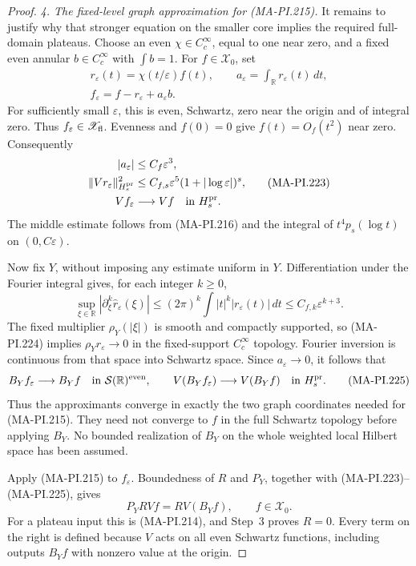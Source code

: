 \begin{proof}
\emph{4. The fixed-level graph approximation for (MA-PI.215).}
It remains to justify why that stronger equation on the
smaller core implies the required full-domain plateaus.
Choose an even \(\chi\in C_c^\infty\), equal to one near
zero, and a fixed even annular \(b\in C_c^\infty\) with
\(\int b=1\).  For \(f\in\mathscr X_0\), set
\[
 \begin{gathered}
 r_\varepsilon(t)=\chi(t/\varepsilon)f(t),\qquad
 a_\varepsilon=\int_{\mathbb R}r_\varepsilon(t)\,dt,\\
 f_\varepsilon=f-r_\varepsilon+a_\varepsilon b.
 \end{gathered}
 \tag{MA-PI.222}
\]
For sufficiently small \(\varepsilon\), this is even,
Schwartz, zero near the origin and of integral zero.
Thus \(f_\varepsilon\in\mathscr X_{\rm fl}\).
Evenness and \(f(0)=0\) give \(f(t)=O_f(t^2)\) near zero.
Consequently
\[
 \begin{aligned}
 |a_\varepsilon|&\le C_f\varepsilon^3,\\
 \|Vr_\varepsilon\|_{H_s^{\rm pr}}^2
     &\le C_{f,s}\varepsilon^5
                         (1+|\log\varepsilon|)^s,\\
 Vf_\varepsilon&\longrightarrow Vf
                                  \quad\text{in }H_s^{\rm pr}.
 \end{aligned}
 \tag{MA-PI.223}
\]
The middle estimate follows from (MA-PI.216) and the
integral of \(t^4p_s(\log t)\) on \((0,C\varepsilon)\).

Now fix \(Y\), without imposing any estimate uniform in
\(Y\).  Differentiation under the Fourier integral gives,
for each integer \(k\ge0\),
\[
 \sup_{\xi\in\mathbb R}
     |\partial_\xi^k\widehat r_\varepsilon(\xi)|
       \le (2\pi)^k\int |t|^k|r_\varepsilon(t)|\,dt
       \le C_{f,k}\varepsilon^{k+3}.
 \tag{MA-PI.224}
\]
The fixed multiplier \(\rho_Y(|\xi|)\) is smooth and
compactly supported, so (MA-PI.224) implies
\(\rho_Y\widehat r_\varepsilon\to0\) in the fixed-support
\(C_c^\infty\) topology.  Fourier inversion is continuous
from that space into Schwartz space.  Since
\(a_\varepsilon\to0\), it follows that
\[
 B_Yf_\varepsilon\longrightarrow B_Yf
            \quad\text{in }\mathcal S(\mathbb R)^{\rm even},
 \qquad
 V(B_Yf_\varepsilon)\longrightarrow V(B_Yf)
            \quad\text{in }H_s^{\rm pr}.
 \tag{MA-PI.225}
\]
Thus the approximants converge in exactly the two graph
coordinates needed for (MA-PI.215).  They need not converge
to \(f\) in the full Schwartz topology before applying
\(B_Y\).  No bounded realization of \(B_Y\) on the whole
weighted local Hilbert space has been assumed.

Apply (MA-PI.215) to \(f_\varepsilon\).  Boundedness of
\(R\) and \(P_Y\), together with (MA-PI.223)--(MA-PI.225),
gives
\[
       P_YRVf=RV(B_Yf),\qquad f\in\mathscr X_0.
 \tag{MA-PI.226}
\]
For a plateau input this is (MA-PI.214), and Step~3 proves
\(R=0\).  Every term on the right is defined because \(V\)
acts on all even Schwartz functions, including outputs
\(B_Yf\) with nonzero value at the origin.
\end{proof}

